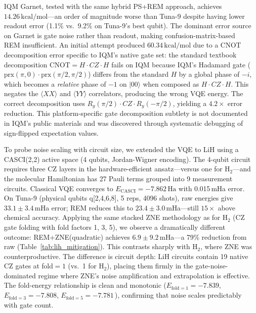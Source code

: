 \documentclass[twocolumn,prl,superscriptaddress,nofootinbib]{revtex4-2}
\newcommand{\Ha}{\,\text{Ha}}
\newcommand{\kcalmol}{\,\text{kcal/mol}}
\begin{document}
IQM Garnet, tested with the same hybrid PS+REM approach, achieves $14.26\kcalmol$---an order of magnitude worse than Tuna-9 despite having lower readout error (1.1\% vs.\ 9.2\% on Tuna-9's best qubit).
The dominant error source on Garnet is gate noise rather than readout, making confusion-matrix-based REM insufficient.
An initial attempt produced $60.34\kcalmol$ due to a CNOT decomposition error specific to IQM's native gate set: the standard textbook decomposition $\text{CNOT} = H \cdot CZ \cdot H$ fails on IQM because IQM's Hadamard gate ($\text{prx}(\pi,0) \cdot \text{prx}(\pi/2,\pi/2)$) differs from the standard $H$ by a global phase of $-i$, which becomes a \emph{relative} phase of $-1$ on $|00\rangle$ when composed as $H \cdot CZ \cdot H$.
This negates the $\langle XX \rangle$ and $\langle YY \rangle$ correlators, producing the wrong VQE energy.
The correct decomposition uses $R_y(\pi/2) \cdot CZ \cdot R_y(-\pi/2)$, yielding a $4.2\times$ error reduction.
This platform-specific gate decomposition subtlety is not documented in IQM's public materials and was discovered through systematic debugging of sign-flipped expectation values.

To probe noise scaling with circuit size, we extended the VQE to LiH using a CASCI(2,2) active space (4 qubits, Jordan-Wigner encoding).
The 4-qubit circuit requires three CZ layers in the hardware-efficient ansatz---versus one for H$_2$---and the molecular Hamiltonian has 27 Pauli terms grouped into 9 measurement circuits.
Classical VQE converges to $E_\text{CASCI} = -7.862\Ha$ with 0.015\,mHa error.
On Tuna-9 (physical qubits q[2,4,6,8], 5 reps, 4096 shots), raw energies give $33.1 \pm 3.4$\,mHa error; REM reduces this to $23.4 \pm 3.0$\,mHa---still $15\times$ above chemical accuracy.
Applying the same stacked ZNE methodology as for H$_2$ (CZ gate folding with fold factors 1, 3, 5), we observe a dramatically different outcome: REM+ZNE(quadratic) achieves $6.9 \pm 9.2$\,mHa---a 79\% reduction from raw (Table~\ref{tab:lih_mitigation}).
This contrasts sharply with H$_2$, where ZNE was counterproductive.
The difference is circuit depth: LiH circuits contain 19 native CZ gates at fold${}=1$ (vs.\ 1 for H$_2$), placing them firmly in the gate-noise-dominated regime where ZNE's noise amplification and extrapolation is effective.
The fold-energy relationship is clean and monotonic ($E_{\text{fold}=1} = -7.839$, $E_{\text{fold}=3} = -7.808$, $E_{\text{fold}=5} = -7.781$\Ha), confirming that noise scales predictably with gate count.
\end{document}
